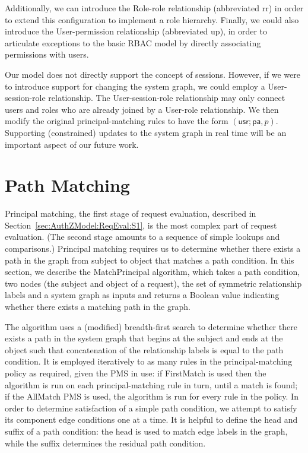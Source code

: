 \documentclass{article}
\newcommand{\comp}{\mathbin{;}}
\begin{document}
Additionally, we can introduce the \textsf{Role-role} relationship (abbreviated \textsf{rr}) in order to extend this configuration to implement a role hierarchy.
Finally, we could also introduce the \textsf{User-permission} relationship (abbreviated \textsf{up}), in order to articulate exceptions to the basic RBAC model by directly associating permissions with users.

Our model does not directly support the concept of sessions.
However, if we were to introduce support for changing the system graph, we could employ a \textsf{User-session-role} relationship.
The \textsf{User-session-role} relationship may only connect users and roles who are already joined by a \textsf{User-role} relationship.
We then modify the original principal-matching rules to have the form $(\textsf{usr} \comp \textsf{pa},p)$.
Supporting (constrained) updates to the system graph in real time will be an important aspect of our future work.

\section{Path Matching}\label{sec:Algorithm}
Principal matching, the first stage of request evaluation, described in Section~\ref{sec:AuthZModel:ReqEval:S1}, is the most complex part of request evaluation.
(The second stage amounts to a sequence of simple lookups and comparisons.)
Principal matching requires us to determine whether there exists a path in the graph from subject to object that matches a path condition.
In this section, we describe the \textsf{MatchPrincipal} algorithm, which takes a path condition, two nodes (the subject and object of a request), the set of symmetric relationship labels and a system graph as inputs and returns a Boolean value indicating whether there exists a matching path in the graph.

The algorithm uses a (modified) breadth-first search to determine whether there exists a path in the system graph that begins at the subject and ends at the object such that concatenation of the relationship labels is equal to the path condition.
It is employed iteratively to as many rules in the principal-matching policy as required, given the PMS in use: if \textsf{FirstMatch} is used then the algorithm is run on each principal-matching rule in turn, until a match is found; if the \textsf{AllMatch} PMS is used, the algorithm is run for every rule in the policy.
In order to determine satisfaction of a simple path condition, we attempt to satisfy its component edge conditions one at a time.
It is helpful to define the head and suffix of a path condition: the head is used to match edge labels in the graph, while the suffix determines the residual path condition.
\end{document}
